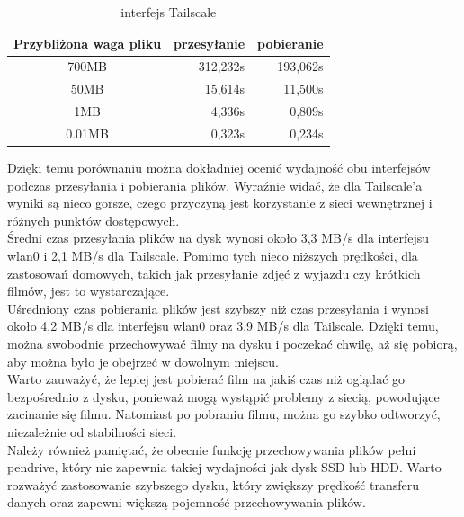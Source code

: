 \documentclass{article}
\begin{document}
\begin {table} [H]
    \begin {center}

        \label {Tabela 3}
        \begin {tabular} { |c|r|r| }
            \hline
            Przybliżona waga pliku & przesyłanie & pobieranie \\
            \hline
            700MB & 312,232s & 193,062s \\
            \hline
            50MB & 15,614s & 11,500s \\
            \hline
            1MB & 4,336s & 0,809s \\
            \hline
            0.01MB & 0,323s & 0,234s \\
            \hline
        \end {tabular}
        \caption {interfejs Tailscale}
    \end {center}
\end {table}
Dzięki temu porównaniu można dokładniej ocenić wydajność obu interfejsów podczas przesyłania i pobierania plików. Wyraźnie widać, że dla Tailscale’a wyniki są nieco gorsze, czego przyczyną jest korzystanie z sieci wewnętrznej i różnych punktów dostępowych.\\

Średni czas przesyłania plików na dysk wynosi około 3,3 MB/s dla interfejsu wlan0 i 2,1 MB/s dla Tailscale. Pomimo tych nieco niższych prędkości, dla zastosowań domowych, takich jak przesyłanie zdjęć z wyjazdu czy krótkich filmów, jest to wystarczające.\\

Uśredniony czas pobierania plików jest szybszy niż czas przesyłania i wynosi około 4,2 MB/s dla interfejsu wlan0 oraz 3,9 MB/s dla Tailscale. Dzięki temu, można swobodnie przechowywać filmy na dysku i poczekać chwilę, aż się pobiorą, aby można było je obejrzeć w dowolnym miejscu.\\

Warto zauważyć, że lepiej jest pobierać film na jakiś czas niż oglądać go bezpośrednio z dysku, ponieważ mogą wystąpić problemy z siecią, powodujące zacinanie się filmu. Natomiast po pobraniu filmu, można go szybko odtworzyć, niezależnie od stabilności sieci.\\

Należy również pamiętać, że obecnie funkcję przechowywania plików pełni pendrive, który nie zapewnia takiej wydajności jak dysk SSD lub HDD. Warto rozważyć zastosowanie szybszego dysku, który zwiększy prędkość transferu danych oraz zapewni większą pojemność przechowywania plików.
\end{document}
